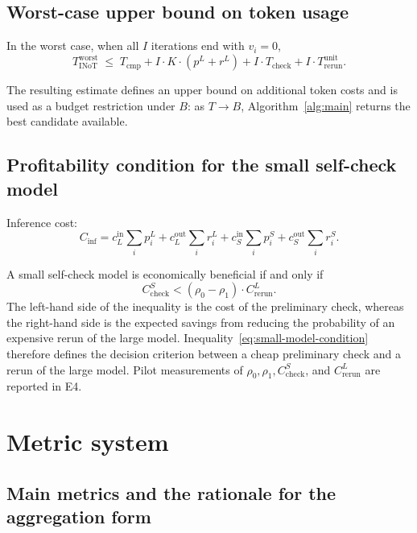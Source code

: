 \subsection{Worst-case upper bound on token usage}

\begin{proposition}\label{prop:worst-case}
In the worst case, when all $I$ iterations end with $v_i=0$,
\[
T_{\text{INoT}}^{\text{worst}}\;\le\;T_{\text{cmp}}+I\cdot K\cdot(p^L+r^L)+I\cdot T_{\text{check}}+I\cdot T_{\text{rerun}}^{\text{unit}}.
\]
\end{proposition}

The resulting estimate defines an upper bound on additional token costs and is used as a budget restriction under $B$: as $T\to B$, Algorithm~\ref{alg:main} returns the best candidate available.

\subsection{Profitability condition for the small self-check model}

Inference cost:
\begin{equation}
C_{\text{inf}}=c_L^{\mathrm{in}}\textstyle\sum_i p_i^L+c_L^{\mathrm{out}}\sum_i r_i^L+c_S^{\mathrm{in}}\sum_i p_i^S+c_S^{\mathrm{out}}\sum_i r_i^S.
\label{eq:cost-inference}
\end{equation}

\noindent A small self-check model is economically beneficial if and only if
\begin{equation}
C_{\text{check}}^S<(\rho_0-\rho_1)\cdot C_{\text{rerun}}^L.
\label{eq:small-model-condition}
\end{equation}
The left-hand side of the inequality is the cost of the preliminary check, whereas the right-hand side is the expected savings from reducing the probability of an expensive rerun of the large model. Inequality~\eqref{eq:small-model-condition} therefore defines the decision criterion between a cheap preliminary check and a rerun of the large model. Pilot measurements of $\rho_0,\rho_1,C_{\text{check}}^S$, and $C_{\text{rerun}}^L$ are reported in E4.

\section{Metric system}\label{sec:metrics}

\subsection{Main metrics and the rationale for the aggregation form}

